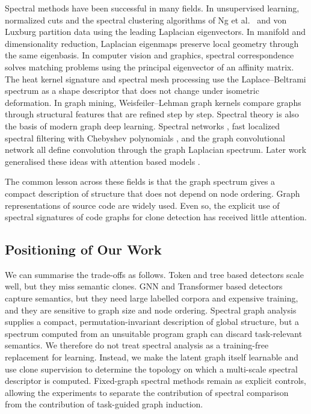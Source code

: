 \documentclass[authoryear,final,5p,times,twocolumn]{elsarticle}
\newcommand{\added}[1]{{\color{green!50!black}#1}}
\theoremstyle{plain}
\begin{document}
Spectral methods have been successful in many fields. In unsupervised
learning, normalized cuts \cite{shi2000normalized} and the spectral
clustering algorithms of Ng et al.\ \cite{ng2002spectral} and von Luxburg
\cite{vonluxburg2007tutorial} partition data using the leading Laplacian
eigenvectors. In manifold and dimensionality reduction, Laplacian
eigenmaps \cite{belkin2003laplacian} preserve local geometry through the
same eigenbasis. In computer vision and graphics, spectral correspondence
\cite{leordeanu2005spectral} solves matching problems using the principal
eigenvector of an affinity matrix. The heat kernel signature
\cite{sun2009hks} and spectral mesh processing
\cite{zhang2010spectralmesh} use the Laplace--Beltrami spectrum as a shape
descriptor that does not change under isometric deformation. In graph
mining, Weisfeiler--Lehman graph kernels \cite{shervashidze2011wl} compare
graphs through structural features that are refined step by step. Spectral
theory is also the basis of modern graph deep learning. Spectral networks
\cite{bruna2014spectral}, fast localized spectral filtering with Chebyshev
polynomials \cite{defferrard2016cnngraph}, and the graph convolutional
network \cite{kipf2017gcn} all define convolution through the graph
Laplacian spectrum. Later work generalised these ideas with attention
based models \cite{velickovic2018gat}.

The common lesson across these fields is that the graph spectrum gives a
compact description of structure that does not depend on node ordering.
Graph representations of source code are widely used. Even so, the
explicit use of spectral signatures of code graphs for clone detection
has received little attention.

\subsection{Positioning of Our Work}
\label{subsec:gap}

We can summarise the trade-offs as follows. Token and tree based detectors
scale well, but they miss semantic clones. GNN and Transformer based
detectors capture semantics, but they need large labelled corpora and
expensive training, and they are sensitive to graph size and node
ordering. \added{Spectral graph analysis supplies a compact, permutation-invariant
description of global structure, but a spectrum computed from an unsuitable
program graph can discard task-relevant semantics. We therefore do not treat
spectral analysis as a training-free replacement for learning. Instead, we make
the latent graph itself learnable and use clone supervision to determine the
topology on which a multi-scale spectral descriptor is computed. Fixed-graph
spectral methods remain as explicit controls, allowing the experiments to
separate the contribution of spectral comparison from the contribution of
task-guided graph induction.}
\end{document}
